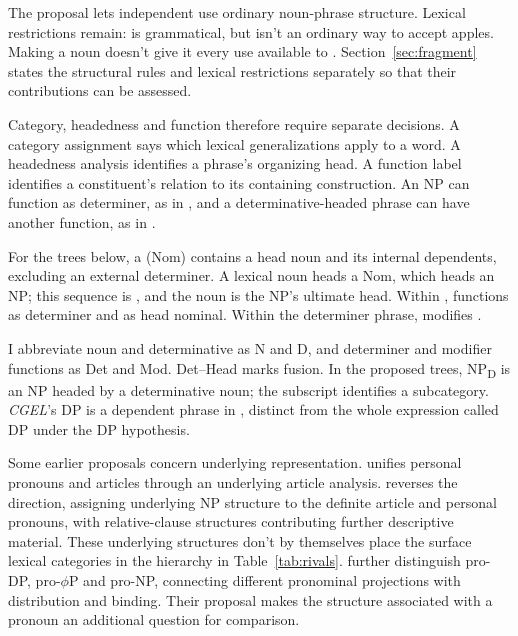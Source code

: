 \documentclass[12pt]{article}
\begin{document}
The proposal lets independent  use ordinary noun-phrase structure. Lexical restrictions remain:  is grammatical, but  isn't an ordinary way to accept apples. Making  a noun doesn't give it every use available to . Section~\ref{sec:fragment} states the structural rules and lexical restrictions separately so that their contributions can be assessed.

Category, headedness and function therefore require separate decisions. A category assignment says which lexical generalizations apply to a word. A headedness analysis identifies a phrase's organizing head. A function label identifies a constituent's relation to its containing construction. An NP can function as determiner, as in , and a determinative-headed phrase can have another function, as in  \citep{payne2010,pullummiller2022nps}.

For the trees below, a  (Nom) contains a head noun and its internal dependents, excluding an external determiner. A lexical noun heads a Nom, which heads an NP; this sequence is , and the noun is the NP's ultimate head. Within ,  functions as determiner and  as head nominal. Within the determiner phrase,  modifies .

I abbreviate noun and determinative as N and D, and determiner and modifier functions as Det and Mod. Det--Head marks fusion. In the proposed trees, NP\textsubscript{D} is an NP headed by a determinative noun; the subscript identifies a subcategory. \textit{CGEL}'s DP is a dependent phrase in , distinct from the whole expression called DP under the DP hypothesis.

Some earlier proposals concern underlying representation. \textcite{postal1966} unifies personal pronouns and articles through an underlying article analysis. \textcite[197--203]{sommerstein1972} reverses the direction, assigning underlying NP structure to the definite article and personal pronouns, with relative-clause structures contributing further descriptive material. These underlying structures don't by themselves place the surface lexical categories in the hierarchy in Table~\ref{tab:rivals}. \textcite{dechainewiltschko2002} further distinguish pro-DP, pro-$\phi$P and pro-NP, connecting different pronominal projections with distribution and binding. Their proposal makes the structure associated with a pronoun an additional question for comparison.
\end{document}
